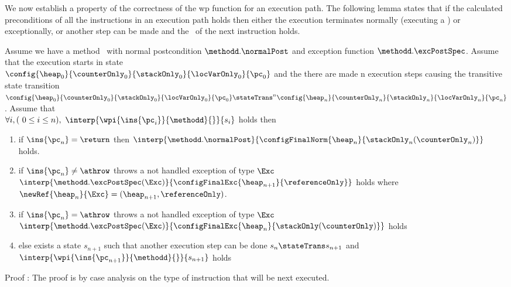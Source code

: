 We now establish a property of the correctness of the wp function  for an execution path. The following lemma states that if the calculated preconditions
of all the instructions in an execution path holds then either the execution terminates normally (executing a \return) or exceptionally, or 
another step can be made and the \fwpi \ of the next instruction holds.



\begin{lemma1}[Progress] \label{lemma1}
Assume we have a method \methodd \ with normal postcondition  $\methodd.\normalPost$ and exception function $\methodd.\excPostSpec$. 
Assume that the  execution starts in state \\
 $ \config{\heap_{0}}{\counterOnly_{0}}{\stackOnly_{0}}{\locVarOnly_{0}}{\pc_{0}}$
and the there are made  n execution steps causing the transitive state transition 
$ \config{\heap_0}{\counterOnly_0}{\stackOnly_0}{\locVarOnly_0}{\pc_0} \stateTrans^{n} \config{\heap_n}{\counterOnly_n}{\stackOnly_n}{\locVarOnly_n}{\pc_n} $.
Assume that \\
 $ \forall i, (\ 0 \leq i \leq n ) , \ \interp{\wpi{\ins{\pc_{i}} }{ \methodd } {  }}{ s_i } $  
holds then
\begin{enumerate}
	\item if $\ins{\pc_n} = \return$  then $\interp{\methodd.\normalPost} {\configFinalNorm{\heap_n}{\stackOnly_n( \counterOnly_n )}} $ holds.  
	
	\item if $\ins{\pc_n}\neq \athrow  $ throws a not handled exception of type $\Exc$ \\
	$\interp{\methodd.\excPostSpec( \Exc)}{\configFinalExc{ \heap_{n+1}}{  \referenceOnly   } } $ holds 
	where $\newRef{\heap_n}{\Exc} = (\heap_{n+1}, \referenceOnly )$.
	
	 \item if $\ins{\pc_n} = \athrow $ throws a not handled exception of type $\Exc$ \\
	$\interp{\methodd.\excPostSpec( \Exc)}{\configFinalExc{ \heap_{n}}{  \stackOnly (\counterOnly)   } } $ holds 
	
	
	\item else exists a state $s_{n+1}$ such that another execution step can be done 
	 $s_n  \stateTrans s_{n+1}$ and  $\interp{ \wpi{\ins{\pc_{n+1}}}{\methodd}{  } } { s_{n+1} } $  holds
\end{enumerate}
\end{lemma1}


Proof :
The proof is by case analysis on the type of instruction that will be next executed. 

